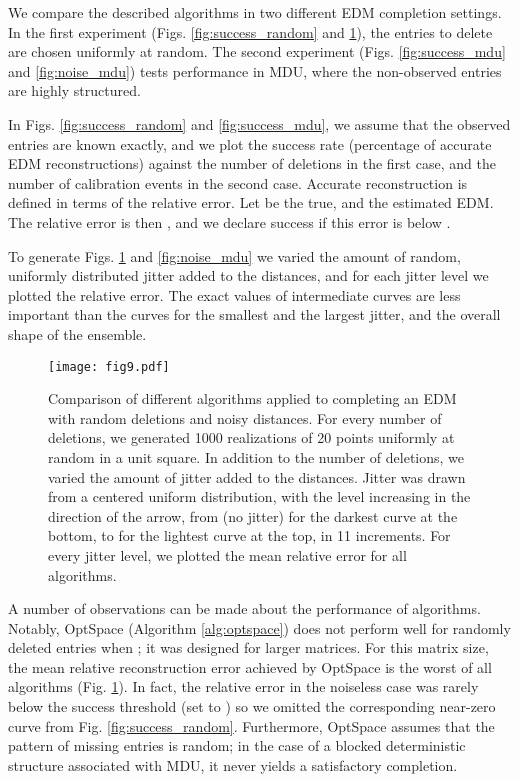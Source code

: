 \documentclass[10pt,double]{IEEEtran}
\newcommand{\rev}[1]{{#1}}
\begin{document}
We compare the described algorithms in two different EDM completion settings.
In the first experiment (Figs. \ref{fig:success_random} and
\ref{fig:noise_random}), the entries to delete are chosen uniformly at random.
The second experiment (Figs. \ref{fig:success_mdu} and \ref{fig:noise_mdu})
tests performance in MDU, where the non-observed entries are highly
structured. \rev{In Figs. \ref{fig:success_random} and \ref{fig:success_mdu}, we
assume that the observed entries are known exactly, and we plot the success
rate (percentage of accurate EDM reconstructions) against the number of
deletions in the first case, and the number of calibration events in the
second case. Accurate reconstruction is defined in terms of the relative
error. Let  be the true, and  the estimated EDM. The relative
error is then , and we declare success if
this error is below .

To generate Figs. \ref{fig:noise_random} and \ref{fig:noise_mdu} we varied the
amount of random, uniformly distributed jitter added to the distances, and for
each jitter level we plotted the relative error. The exact values of
intermediate curves are less important than the curves for the smallest and
the largest jitter, and the overall shape of the ensemble.

\begin{figure}[t!]
\centering
\texttt{[image: fig9.pdf]}
\caption{\rev{Comparison of different algorithms applied to completing an EDM with
random deletions and noisy distances. For every number of deletions, we
generated 1000 realizations of 20 points uniformly at random in a unit square.
In addition to the number of deletions, we varied the amount of jitter added
to the distances. Jitter was drawn from a centered uniform distribution, with
the level increasing in the direction of the arrow, from 
(no jitter) for the darkest curve at the bottom, to 
for the lightest curve at the top, in 11 increments. For every jitter level,
we plotted the mean relative error  for all algorithms.}}
\label{fig:noise_random}
\end{figure}

A number of observations can be made about the performance of algorithms.
Notably, OptSpace (Algorithm \ref{alg:optspace}) does not perform well
for randomly deleted entries when ; it was designed for larger
matrices. For this matrix size, the mean relative reconstruction error
achieved by OptSpace is the worst of all algorithms (Fig.
\ref{fig:noise_random}). In fact, the relative error in the noiseless case was
rarely below the success threshold (set to ) so we omitted the corresponding near-zero curve from Fig.
\ref{fig:success_random}. Furthermore, OptSpace assumes that the pattern of
missing entries is random; in the case of a blocked deterministic structure
associated with MDU, it never yields a satisfactory completion.

}
\end{document}
